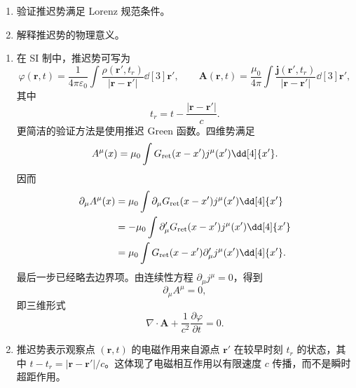 \begin{question}[推迟势]
\begin{enumerate}
  \item 验证推迟势满足 Lorenz 规范条件。
  \item 解释推迟势的物理意义。
\end{enumerate}
\begin{solution}
\begin{enumerate}
  \item 在 SI 制中，推迟势可写为
  \[
    \varphi(\mathbf r,t)=\frac{1}{4\pi\varepsilon_0}\int
    \frac{\rho(\mathbf r',t_r)}{|\mathbf r-\mathbf r'|}\dd[3]{\mathbf r'},
    \qquad
    \mathbf A(\mathbf r,t)=\frac{\mu_0}{4\pi}\int
    \frac{\mathbf j(\mathbf r',t_r)}{|\mathbf r-\mathbf r'|}\dd[3]{\mathbf r'},
  \]
  其中
  \[
    t_r=t-\frac{|\mathbf r-\mathbf r'|}{c} .
  \]
  更简洁的验证方法是使用推迟 Green 函数。四维势满足
  \[
    A^\mu(x)=\mu_0\int G_{\rm ret}(x-x')j^\mu(x')\dd[4]{x'} .
  \]
  因而
  \[
  \begin{aligned}
    \partial_\mu A^\mu(x)
    &=\mu_0\int \partial_\mu G_{\rm ret}(x-x')j^\mu(x')\dd[4]{x'} \\
    &=-\mu_0\int \partial'_\mu G_{\rm ret}(x-x')j^\mu(x')\dd[4]{x'} \\
    &=\mu_0\int G_{\rm ret}(x-x')\partial'_\mu j^\mu(x')\dd[4]{x'} .
  \end{aligned}
  \]
  最后一步已经略去边界项。由连续性方程 $\partial_\mu j^\mu=0$，得到
  \[
    \partial_\mu A^\mu=0,
  \]
  即三维形式
  \[
    \nabla\cdot\mathbf A+\frac{1}{c^2}\frac{\partial\varphi}{\partial t}=0 .
  \]

  \item 推迟势表示观察点 $(\mathbf r,t)$ 的电磁作用来自源点 $\mathbf r'$ 在较早时刻 $t_r$ 的状态，其中 $t-t_r=|\mathbf r-\mathbf r'|/c$。这体现了电磁相互作用以有限速度 $c$ 传播，而不是瞬时超距作用。
\end{enumerate}
\end{solution}
\end{question}

